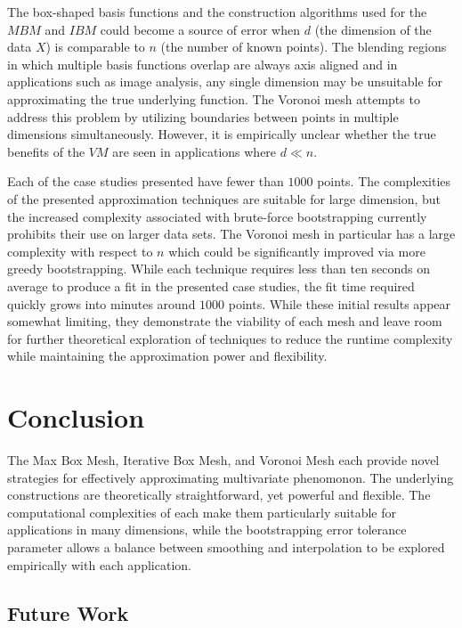 \documentclass[sigconf]{acmart}
\begin{document}
The box-shaped basis functions and the construction algorithms used for the $MBM$ and $IBM$ could become a source of error when $d$ (the dimension of the data $X$) is comparable to $n$ (the number of known points). The blending regions in which multiple basis functions overlap are always axis aligned and in applications such as image analysis, any single dimension may be unsuitable for approximating the true underlying function. The Voronoi mesh attempts to address this problem by utilizing boundaries between points in multiple dimensions simultaneously. However, it is empirically unclear whether the true benefits of the $VM$ are seen in applications where $d \ll n$.

Each of the case studies presented have fewer than $1000$ points. The complexities of the presented approximation techniques are suitable for large dimension, but the increased complexity associated with brute-force bootstrapping currently prohibits their use on larger data sets. The Voronoi mesh in particular has a large complexity with respect to $n$ which could be significantly improved via more greedy bootstrapping. While each technique requires less than ten seconds on average to produce a fit in the presented case studies, the fit time required quickly grows into minutes around $1000$ points. While these initial results appear somewhat limiting, they demonstrate the viability of each mesh and leave room for further theoretical exploration of techniques to reduce the runtime complexity while maintaining the approximation power and flexibility.

\section{Conclusion}

The Max Box Mesh, Iterative Box Mesh, and Voronoi Mesh each provide novel strategies for effectively approximating multivariate phenomonon. The underlying constructions are theoretically straightforward, yet powerful and flexible. The computational complexities of each make them particularly suitable for applications in many dimensions, while the bootstrapping error tolerance parameter allows a balance between smoothing and interpolation to be explored empirically with each application.

\subsection{Future Work}
\end{document}
